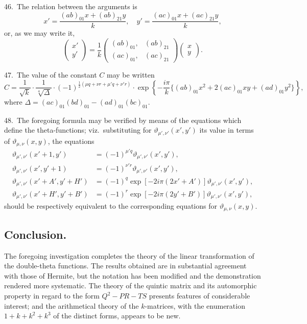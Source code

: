 \documentclass[11pt,a4paper]{book}
\begin{document}
\medskip

46.\ The relation between the arguments is
\[
x' = \frac{(ab)_{01}x + (ab)_{21}y}{k}, \quad y' = \frac{(ac)_{01}x + (ac)_{21}y}{k},
\]
or, as we may write it,
\[
\begin{pmatrix} x' \\ y' \end{pmatrix}
= \frac{1}{k}
\begin{pmatrix} (ab)_{01}, & (ab)_{21} \\ (ac)_{01}, & (ac)_{21} \end{pmatrix}
\begin{pmatrix} x \\ y \end{pmatrix}.
\]

\medskip

47.\ The value of the constant $C$ may be written
\[
C = \frac{1}{\sqrt{k}} \cdot \frac{1}{\sqrt[4]{\Delta}} \cdot (-1)^{\frac{1}{2}(\mu q + \nu r + \mu' q + \nu' r)} \cdot \exp\left\{-\frac{i\pi}{k}\{(ab)_{01}x^2 + 2(ac)_{01}xy + (ad)_{01}y^2\}\right\},
\]
where $\Delta = (ac)_{01}(bd)_{01} - (ad)_{01}(bc)_{01}$.

\medskip

48.\ The foregoing formula may be verified by means of the equations which define the theta-functions; viz.\ substituting for $\vartheta_{\mu',\nu'}(x', y')$ its value in terms of $\vartheta_{\mu,\nu}(x, y)$, the equations
\begin{align*}
\vartheta_{\mu',\nu'}(x'+1, y') &= (-1)^{\mu' q}\vartheta_{\mu',\nu'}(x', y'),\\
\vartheta_{\mu',\nu'}(x', y'+1) &= (-1)^{\nu' r}\vartheta_{\mu',\nu'}(x', y'),\\
\vartheta_{\mu',\nu'}(x'+A', y'+H') &= (-1)^{q}\exp[-2i\pi(2x'+A')]\vartheta_{\mu',\nu'}(x', y'),\\
\vartheta_{\mu',\nu'}(x'+H', y'+B') &= (-1)^{r}\exp[-2i\pi(2y'+B')]\vartheta_{\mu',\nu'}(x', y'),
\end{align*}
should be respectively equivalent to the corresponding equations for $\vartheta_{\mu,\nu}(x, y)$.

\bigskip

\subsection*{Conclusion.}

The foregoing investigation completes the theory of the linear transformation of the double-theta functions. The results obtained are in substantial agreement with those of Hermite, but the notation has been modified and the demonstration rendered more systematic. The theory of the quintic matrix and its automorphic property in regard to the form $Q^2 - PR - TS$ presents features of considerable interest; and the arithmetical theory of the $k$-matrices, with the enumeration $1 + k + k^2 + k^3$ of the distinct forms, appears to be new.
\end{document}
